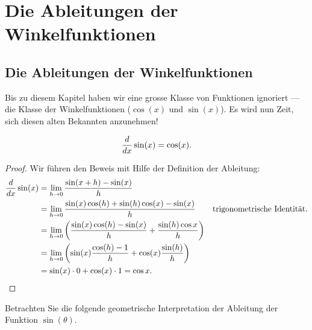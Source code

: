 \chapter{Die Ableitungen der Winkelfunktionen}



\section{Die Ableitungen der Winkelfunktionen}

Bis zu diesem Kapitel haben wir eine grosse Klasse von Funktionen ignoriert --- die Klasse der Winkelfunktionen ($\cos(x)$ und $\sin(x)$). Es wird nun Zeit, sich diesen alten Bekannten anzunehmen!


\begin{theorem}\label{theorem:deriv sin}
\[
\frac{d}{dx} \sin(x) = \cos(x).
\]
\end{theorem}
\begin{proof}
Wir führen den Beweis mit Hilfe der Definition der Ableitung:
\begin{align*}
\frac{d}{dx} \sin(x) &= \lim_{h\to0} \frac{\sin(x+h)-\sin(x)}{h} \\
&= \lim_{h\to0} \frac{\sin(x)\cos(h)+\sin(h)\cos(x)-\sin(x)}{h}  & \text{trigonometrische Identität.}\\
&= \lim_{h\to0} \left(\frac{\sin(x)\cos(h)-\sin(x)}{h} + \frac{\sin(h)\cos{x}}{h} \right)\\
&=\lim_{h\to0} \left(\sin (x)\frac{\cos(h) - 1}{h}+\cos(x)\frac{\sin(h)}{h}\right) \\
&=\sin(x) \cdot 0 + \cos(x) \cdot 1 = \cos x. & 
\end{align*}
\end{proof}

Betrachten Sie die folgende geometrische Interpretation der Ableitung der Funktion
$\sin(\theta)$.  

